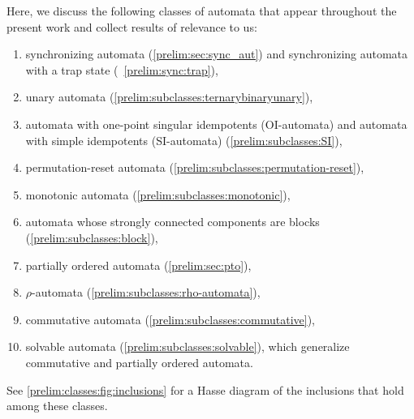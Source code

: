 
Here, we discuss the following classes of automata
that appear throughout the present work
and collect results of relevance to us:

\begin{enumerate}
	\item synchronizing automata (\cref{prelim:sec:sync_aut}) and synchronizing automata with a trap state (\SEC~\ref{prelim:sync:trap}),
	
	\item unary automata (\cref{prelim:subclasses:ternarybinaryunary}),
				
	\item automata with one-point singular idempotents (OI-automata) and automata with simple idempotents (SI-automata) (\cref{prelim:subclasses:SI}),
	
	\item permutation-reset automata (\cref{prelim:subclasses:permutation-reset}),
		
	\item monotonic automata (\cref{prelim:subclasses:monotonic}),
	
	\item automata whose strongly connected components are blocks (\cref{prelim:subclasses:block}),
		
	\item partially ordered automata (\cref{prelim:sec:pto}), 
	
	\item $\rho$-automata (\cref{prelim:subclasses:rho-automata}),
	
	\item commutative automata (\cref{prelim:subclasses:commutative}),
	    
	\item solvable automata (\cref{prelim:subclasses:solvable}),
	 which generalize commutative and partially ordered automata.
\end{enumerate}

See \cref{prelim:classes:fig:inclusions} for a Hasse diagram of the inclusions that hold among these classes.

